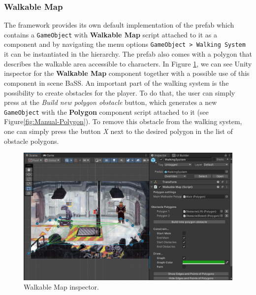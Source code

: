 \subsubsection{Walkable Map}
The framework provides its own default implementation of the prefab which contains a \verb|GameObject| with \textbf{Walkable Map} script attached to it as a component and by navigating the menu options \verb|GameObject > Walking System| it can be instantiated in the hierarchy. The prefab also comes with a polygon that describes the walkable area accessible to characters. In Figure \ref{fig:Manual-WM}, we can see Unity inspector for the \textbf{Walkable Map} component together with a possible use of this component in scene BaSS. An important part of the walking system is the possibility to create obstacles for the player. To do that, the user can simply press at the \textit{Build new polygon obstacle} button, which generates a new \verb|GameObject| with the \textbf{Polygon} component script attached to it (see Figure\ref{fig:Manual-Polygon}). To remove this obstacle from the walking system, one can simply press the button \textit{X} next to the desired polygon in the list of obstacle polygons. 

\begin{figure}[H]
\centering
\includegraphics[width=1\linewidth]{img/User doc/walkable_map.png}
\caption{Walkable Map inspector.}
\label{fig:Manual-WM}
\end{figure}

